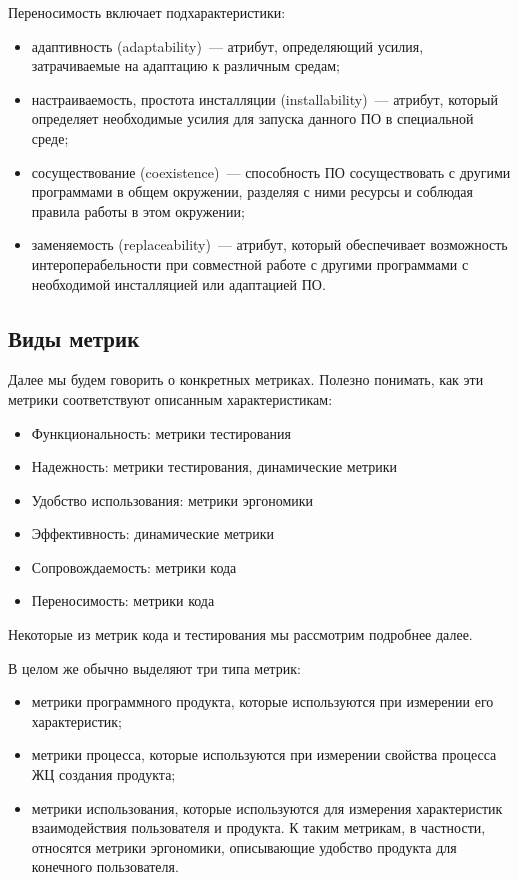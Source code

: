 \documentclass{../../text-style}
\begin{document}
Переносимость включает подхарактеристики:

\begin{itemize}
    \item адаптивность (adaptability)~--- атрибут, определяющий усилия, затрачиваемые на адаптацию к различным средам;
    \item настраиваемость, простота инсталляции (installability)~--- атрибут, который определяет необходимые усилия для запуска данного ПО в специальной среде;
    \item сосуществование (coexistence)~--- способность ПО сосуществовать с другими программами в общем окружении, разделяя с ними ресурсы и соблюдая правила работы в этом окружении;
    \item заменяемость (replaceability)~--- атрибут, который обеспечивает возможность интероперабельности при совместной работе с другими программами с необходимой инсталляцией или адаптацией ПО.
\end{itemize}

\subsection{Виды метрик}


Далее мы будем говорить о конкретных метриках. Полезно понимать, как эти метрики соответствуют описанным характеристикам:

\begin{itemize}
    \item Функциональность: метрики тестирования
    \item Надежность: метрики тестирования, динамические метрики
    \item Удобство использования: метрики эргономики
    \item Эффективность: динамические метрики
    \item Сопровождаемость: метрики кода
    \item Переносимость: метрики кода
\end{itemize}

Некоторые из метрик кода и тестирования мы рассмотрим подробнее далее.

В целом же обычно выделяют три типа метрик:

\begin{itemize}
    \item метрики программного продукта, которые используются при измерении его характеристик;
    \item метрики процесса, которые используются при измерении свойства процесса ЖЦ создания продукта;
    \item метрики использования, которые используются для измерения характеристик взаимодействия пользователя и продукта. К таким метрикам, в частности, относятся метрики эргономики, описывающие удобство продукта для конечного пользователя.
\end{itemize}
\end{document}
